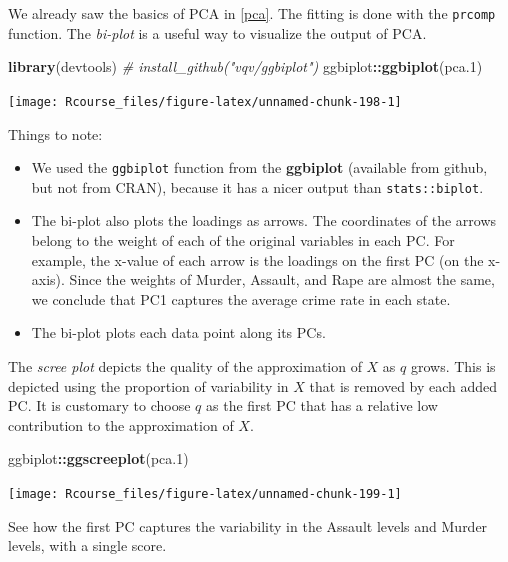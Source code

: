 \documentclass[]{book}
\newenvironment{Shaded}{\begin{snugshade}}{\end{snugshade}}
\newcommand{\KeywordTok}[1]{\textcolor[rgb]{0.13,0.29,0.53}{\textbf{#1}}}
\newcommand{\DecValTok}[1]{\textcolor[rgb]{0.00,0.00,0.81}{#1}}
\newcommand{\CommentTok}[1]{\textcolor[rgb]{0.56,0.35,0.01}{\textit{#1}}}
\newcommand{\OperatorTok}[1]{\textcolor[rgb]{0.81,0.36,0.00}{\textbf{#1}}}
\newcommand{\NormalTok}[1]{#1}
\providecommand{\tightlist}{%
  \setlength{\itemsep}{0pt}\setlength{\parskip}{0pt}}
\theoremstyle{definition}
\theoremstyle{definition}
\theoremstyle{definition}
\theoremstyle{remark}
\begin{document}
We already saw the basics of PCA in \ref{pca}. The fitting is done with
the \texttt{prcomp} function. The \emph{bi-plot} is a useful way to
visualize the output of PCA.

\begin{Shaded}
\begin{Highlighting}[]
\KeywordTok{library}\NormalTok{(devtools)}
\CommentTok{# install_github("vqv/ggbiplot")}
\NormalTok{ggbiplot}\OperatorTok{::}\KeywordTok{ggbiplot}\NormalTok{(pca.}\DecValTok{1}\NormalTok{) }
\end{Highlighting}
\end{Shaded}

\texttt{[image: Rcourse\_files/figure-latex/unnamed-chunk-198-1]}

Things to note:

\begin{itemize}
\tightlist
\item
  We used the \texttt{ggbiplot} function from the \textbf{ggbiplot}
  (available from github, but not from CRAN), because it has a nicer
  output than \texttt{stats::biplot}.
\item
  The bi-plot also plots the loadings as arrows. The coordinates of the
  arrows belong to the weight of each of the original variables in each
  PC. For example, the x-value of each arrow is the loadings on the
  first PC (on the x-axis). Since the weights of Murder, Assault, and
  Rape are almost the same, we conclude that PC1 captures the average
  crime rate in each state.
\item
  The bi-plot plots each data point along its PCs.
\end{itemize}

The \emph{scree plot} depicts the quality of the approximation of \(X\)
as \(q\) grows. This is depicted using the proportion of variability in
\(X\) that is removed by each added PC. It is customary to choose \(q\)
as the first PC that has a relative low contribution to the
approximation of \(X\).

\begin{Shaded}
\begin{Highlighting}[]
\NormalTok{ggbiplot}\OperatorTok{::}\KeywordTok{ggscreeplot}\NormalTok{(pca.}\DecValTok{1}\NormalTok{)}
\end{Highlighting}
\end{Shaded}

\texttt{[image: Rcourse\_files/figure-latex/unnamed-chunk-199-1]}

See how the first PC captures the variability in the Assault levels and
Murder levels, with a single score.
\end{document}
